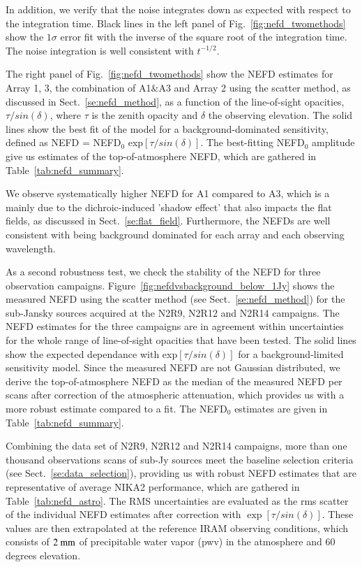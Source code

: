 In addition, we verify that the noise integrates down as expected with
respect to the integration time. Black lines in the left panel of
Fig.~\ref{fig:nefd_twomethods} show the $1\sigma$ error fit with the
inverse of the square root of the integration time. The noise
integration is well consistent with $t^{-1/2}$.

The right panel of Fig.~\ref{fig:nefd_twomethods} show the NEFD
estimates for  Array 1, 3, the combination of A1$\&$A3 and Array 2
using the scatter method, as discussed in Sect.~\ref{se:nefd_method},
as a function of the line-of-sight opacities, $\tau/sin(\delta)$,
where $\tau$ is the zenith opacity and $\delta$ the observing
elevation. The solid lines show the best fit of the model for a
background-dominated sensitivity,
defined as NEFD = NEFD$_0$ exp${[\tau/sin(\delta)]}$. The best-fitting
NEFD$_0$ amplitude give us estimates of the
top-of-atmosphere NEFD, which are gathered in
Table~\ref{tab:nefd_summary}.

We observe systematically higher NEFD for A1 compared to
A3, which is a mainly due to the dichroic-induced 'shadow effect' that
also impacts the flat fields, as discussed in
Sect.~\ref{se:flat_field}. Furthermore, the NEFDs are well consistent
with being background dominated for each array and each observing
wavelength. 

As a second robustness test, we check the stability of the NEFD for
three observation campaigns. Figure~\ref{fig:nefdvsbackground_below_1Jy} shows the
measured NEFD using the scatter method (see Sect.~\ref{se:nefd_method}) for the
sub-Jansky sources acquired at the N2R9, N2R12 and N2R14
campaigns. The NEFD estimates for the
three campaigns are in agreement within uncertainties for the whole
range of line-of-sight opacities that have been tested.
The solid lines show the expected dependance with
exp${[\tau/sin(\delta)]}$ for a background-limited sensitivity
model. Since the measured NEFD are not Gaussian distributed, we
derive the top-of-atmosphere NEFD as the median of the measured NEFD
per scans after correction of the atmospheric attenuation, which provides us
with a more robust estimate compared to a fit. The NEFD$_0$ estimates
are given in Table~\ref{tab:nefd_summary}.

Combining the data set of N2R9, N2R12 and N2R14 campaigns,
more than one thousand observations scans of sub-Jy sources meet the
baseline selection criteria (see Sect.~\ref{se:data_selection}),
providing us with robust NEFD estimates that are representative of
average NIKA2 performance, which are gathered in
Table~\ref{tab:nefd_astro}.
The RMS uncertainties are evaluated as the rms scatter of the
individual NEFD estimates after correction with
$\exp[\tau/sin(\delta)]$. These values are then extrapolated at the
reference IRAM observing conditions, which consists of $2~\rm{mm}$
of precipitable water vapor (pwv) in the atmosphere and $60$ degrees
elevation.  

